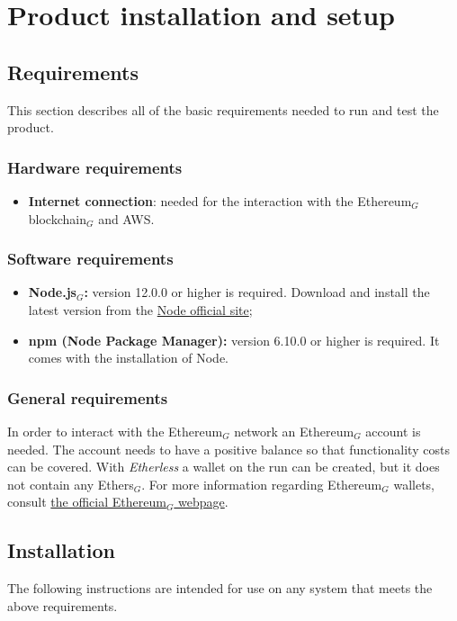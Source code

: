 \section{Product installation and setup}
  \subsection{Requirements}
    This section describes all of the basic requirements needed to run and test the product.
    \subsubsection{Hardware requirements}
      \begin{itemize}
      	\item \textbf{Internet connection}: needed for the interaction with the Ethereum$_{G}$ blockchain$_{G}$ and AWS.
      \end{itemize}
    \subsubsection{Software requirements}
      \begin{itemize}
        \item \textbf{Node.js$_{G}$:} version 12.0.0 or higher is required. Download and install the latest version from the \href{https://nodejs.org/it/download/}{Node official site};
        \item \textbf{npm (Node Package Manager):} version 6.10.0 or higher is required. It comes with the installation of Node.
      \end{itemize}
    \subsubsection{General requirements}
      In order to interact with the Ethereum$_{G}$ network an Ethereum$_{G}$ account is needed. The account needs to have a positive balance so that functionality costs can be covered. With \textit{Etherless} a wallet on the run can be created, but it does not contain any Ethers$_{G}$. For more information regarding Ethereum$_{G}$ wallets, consult \href{https://ethereum.org/en/wallets/}{the official Ethereum$_{G}$ webpage}.
      
  \subsection{Installation}
    The following instructions are intended for use on any system that meets the above requirements.
    
